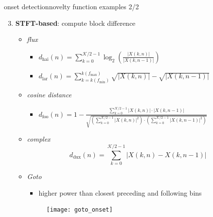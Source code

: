         \begin{frame}{onset detection}{novelty function examples 2/2}
            \begin{enumerate}   
                \setcounter{enumi}{2}
                \item	\textbf{STFT-based}: compute block difference 
                    \begin{itemize}
                        \item	\textit{flux}
                        {
                            \begin{itemize}
                                \item $d_\mathrm{hai}(n) = \sum\limits_{k = 0}^{\mathcal{K}/2-1}{\log_2\left(\frac{|X(k,n)|}{|X(k,n-1)|}\right)}$
                                \item $d_\mathrm{lar}(n) = \sum\limits_{k = k(f_{\mathrm{min}})}^{k(f_{\mathrm{max}})}{\sqrt{|X(k,n)|}-\sqrt{|X(k,n-1)|}}$
                            \end{itemize}
                        }
                        \item<2->	\textit{cosine distance}
                        {
                            \begin{itemize}
                                \item $d_\mathrm{foo}(n)	= 1 - \frac{\sum\limits_{k = 0}^{\mathcal{K}/2-1}{|X(k,n)|\cdot |X(k,n-1)|}}{\sqrt{\left(\sum\limits_{k=0}^{\mathcal{K}/2-1}{|X(k,n)|^2}\right)\cdot \left(\sum\limits_{k=0}^{\mathcal{K}/2-1}{|X(k,n-1)|^2}\right)}}$
                            \end{itemize}
                        }
                        \item<3->	\textit{complex}
                        {
                            \begin{equation*}
                                d_\mathrm{dux}(n) = \sum\limits_{k = 0}^{\mathcal{K}/2-1}{|X(k,n)-X(k,n-1)|}
                            \end{equation*}
                        }
                        \item<4->	\textit{Goto}
                            \begin{itemize}
                                \item	higher power than closest preceding and following bins
                            \end{itemize}
                        {							
                            \begin{figure}
                                \centering
                                \texttt{[image: goto\_onset]}
                            \end{figure}
                        }
                    \end{itemize}
            \end{enumerate}
        \end{frame}
